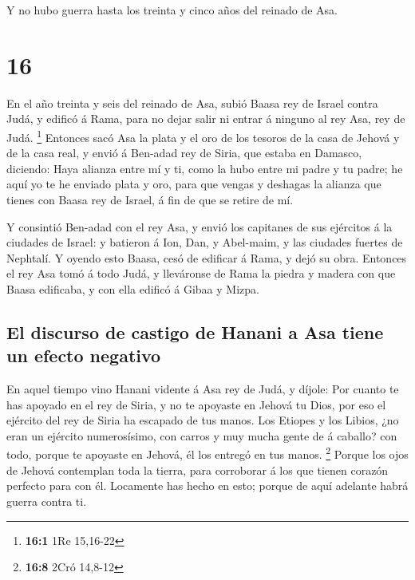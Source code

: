  Y no hubo guerra hasta los treinta y cinco años del
reinado de Asa.

\hypertarget{section-15}{%
\section{16}\label{section-15}}

 En el año treinta y seis del reinado de Asa, subió Baasa
rey de Israel contra Judá, y edificó á Rama, para no dejar salir ni
entrar á ninguno al rey Asa, rey de Judá. \footnote{\textbf{16:1} 1Re
  15,16-22}  Entonces sacó Asa la plata y el oro de los
tesoros de la casa de Jehová y de la casa real, y envió á Ben-adad rey
de Siria, que estaba en Damasco, diciendo:  Haya alianza
entre mí y ti, como la hubo entre mi padre y tu padre; he aquí yo te he
enviado plata y oro, para que vengas y deshagas la alianza que tienes
con Baasa rey de Israel, á fin de que se retire de mí.

 Y consintió Ben-adad con el rey Asa, y envió los capitanes
de sus ejércitos á la ciudades de Israel: y batieron á Ion, Dan, y
Abel-maim, y las ciudades fuertes de Nephtalí.  Y oyendo
esto Baasa, cesó de edificar á Rama, y dejó su obra. 
Entonces el rey Asa tomó á todo Judá, y lleváronse de Rama la piedra y
madera con que Baasa edificaba, y con ella edificó á Gibaa y Mizpa.

\hypertarget{el-discurso-de-castigo-de-hanani-a-asa-tiene-un-efecto-negativo}{%
\subsection{El discurso de castigo de Hanani a Asa tiene un efecto
negativo}\label{el-discurso-de-castigo-de-hanani-a-asa-tiene-un-efecto-negativo}}

 En aquel tiempo vino Hanani vidente á Asa rey de Judá, y
díjole: Por cuanto te has apoyado en el rey de Siria, y no te apoyaste
en Jehová tu Dios, por eso el ejército del rey de Siria ha escapado de
tus manos.  Los Etiopes y los Libios, ¿no eran un ejército
numerosísimo, con carros y muy mucha gente de á caballo? con todo,
porque te apoyaste en Jehová, él los entregó en tus manos. \footnote{\textbf{16:8}
  2Cró 14,8-12}  Porque los ojos de Jehová contemplan toda
la tierra, para corroborar á los que tienen corazón perfecto para con
él. Locamente has hecho en esto; porque de aquí adelante habrá guerra
contra ti.

